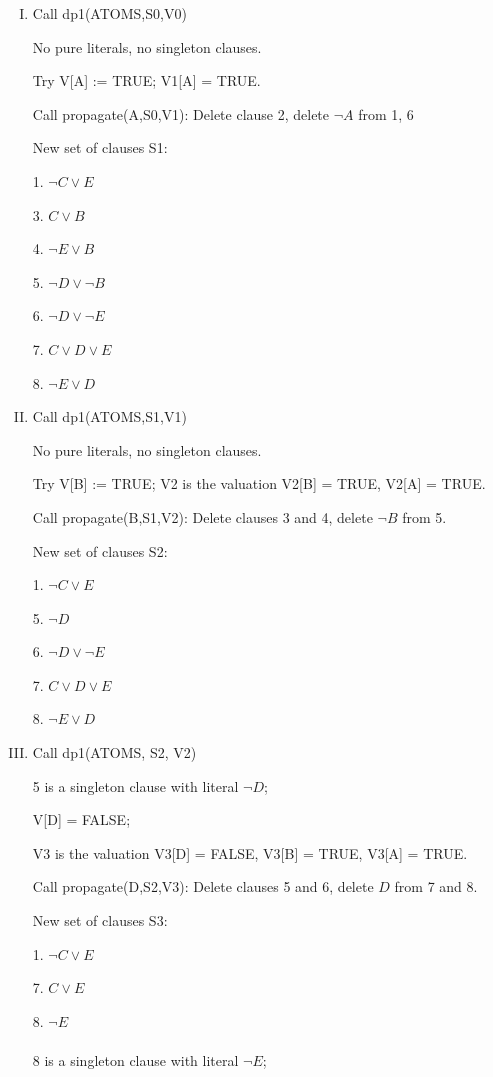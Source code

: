 \documentclass[11pt]{article}
\begin{document}
	\begin{enumerate}[I.]
		\item Call dp1(ATOMS,S0,V0)
		
		No pure literals, no singleton clauses.
		
		Try V[A] := TRUE; V1[A] = TRUE.
		
		Call propagate(A,S0,V1): Delete clause 2, delete $ \neg A $ from 1, 6
		
		New set of clauses S1:
		
		1. $ \neg C\vee E $
		
		3. $ C\vee B $
		
		4. $ \neg E\vee B $
		
		5. $ \neg D\vee \neg B $
		
		6. $ \neg D\vee \neg E $
		
		7. $ C\vee D\vee E $
		
		8. $ \neg E\vee D $
		\item Call dp1(ATOMS,S1,V1)
		
		No pure literals, no singleton clauses.
		
		Try V[B] := TRUE; V2 is the valuation V2[B] = TRUE, V2[A] = TRUE.
		
		Call propagate(B,S1,V2): Delete clauses 3 and 4, delete $ \neg B $ from 5.
		
		New set of clauses S2:
		
		1. $ \neg C\vee E $
		
		5. $ \neg D $
		
		6. $ \neg D\vee \neg E $
		
		7. $ C\vee D\vee E $
		
		8. $ \neg E\vee D $
		
		\item Call dp1(ATOMS, S2, V2)
		
		5 is a singleton clause with literal $ \neg D $;
		
		V[D] = FALSE;
		
		V3 is the valuation V3[D] = FALSE, V3[B] = TRUE, V3[A] = TRUE.
		
		Call propagate(D,S2,V3): Delete clauses 5 and 6, delete $ D $ from 7 and 8.
		
		New set of clauses S3:
		
		1. $ \neg C\vee E $
		
		7. $ C\vee E $
		
		8. $ \neg E $
		\\
		\\
		8 is a singleton clause with literal $ \neg E $;
		

\end{enumerate}
\end{document}
